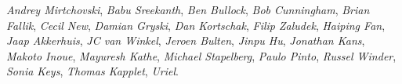 \emph{Andrey Mirtchovski},
\emph{Babu Sreekanth},
\emph{Ben Bullock},
\emph{Bob Cunningham},
\emph{Brian Fallik},
\emph{Cecil New},
\emph{Damian Gryski},
\emph{Dan Kortschak},
\emph{Filip Zaludek},
\emph{Haiping Fan},
\emph{Jaap Akkerhuis},
\emph{JC van Winkel},
\emph{Jeroen Bulten},
\emph{Jinpu Hu},
\emph{Jonathan Kans},
\emph{Makoto Inoue},
\emph{Mayuresh Kathe},
\emph{Michael Stapelberg},
\emph{Paulo Pinto},
\emph{Russel Winder},
\emph{Sonia Keys},
\emph{Thomas Kapplet},
\emph{Uriel}.
